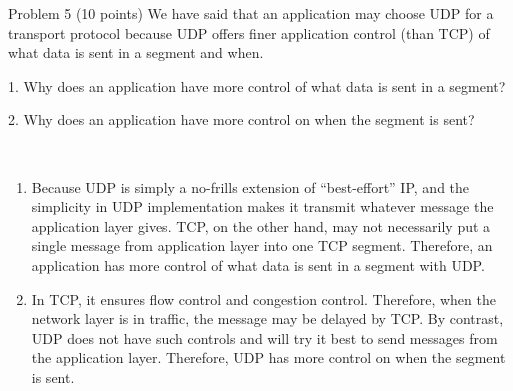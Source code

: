 \begin{exercise}[]{Problem 5 (10 points) We have said that an application may choose UDP for a transport protocol because UDP offers finer application control (than TCP) of what data is sent in a segment and when.
    
    1. Why does an application have more control of what data is sent in a segment? 
    
    2. Why does an application have more control on when the segment is sent?}
  \begin{solution}
  \par{~}
  \begin{enumerate}
      \item Because UDP is simply a no-frills extension of “best-effort” IP, and the simplicity in UDP implementation makes it transmit whatever message the application layer gives. TCP, on the other hand, may not necessarily put a single message from application layer into one TCP segment. Therefore, an application has more control of what data is sent in a segment with UDP.
      \item In TCP, it ensures flow control and congestion control. Therefore, when the network layer is in traffic, the message may be delayed by TCP. By contrast, UDP does not have such controls and will try it best to send messages from the application layer. Therefore, UDP has more control on when the segment is sent.
  \end{enumerate}
  \end{solution}
  \label{ex5}
\end{exercise}


